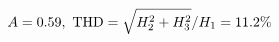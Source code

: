 \documentclass[preview]{standalone}
\begin{document}
\begin{align*}
\special{dvisvgm:raw <g id='unique000'>}A=0.59,\ \text{THD}=\sqrt{H_2^2+H_3^2}/H_1=11.2\%\special{dvisvgm:raw </g>}
\end{align*}
\end{document}
